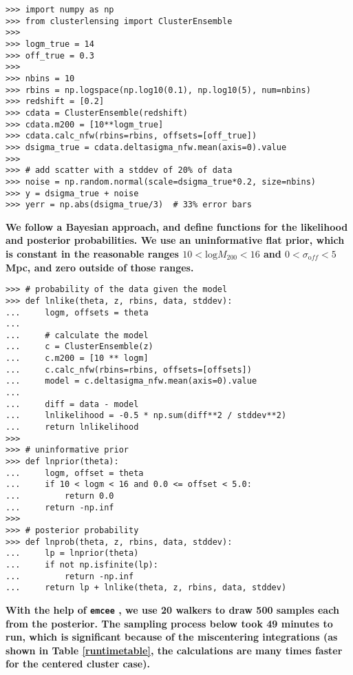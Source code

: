\documentclass[twocolumn]{aastex6}
\newcommand{\code}{\lstinline[style=codeintext]}
\begin{document}
\begin{verbatim}
>>> import numpy as np
>>> from clusterlensing import ClusterEnsemble
>>> 
>>> logm_true = 14
>>> off_true = 0.3
>>> 
>>> nbins = 10
>>> rbins = np.logspace(np.log10(0.1), np.log10(5), num=nbins)
>>> redshift = [0.2]
>>> cdata = ClusterEnsemble(redshift)
>>> cdata.m200 = [10**logm_true]
>>> cdata.calc_nfw(rbins=rbins, offsets=[off_true])
>>> dsigma_true = cdata.deltasigma_nfw.mean(axis=0).value
>>> 
>>> # add scatter with a stddev of 20% of data
>>> noise = np.random.normal(scale=dsigma_true*0.2, size=nbins)
>>> y = dsigma_true + noise
>>> yerr = np.abs(dsigma_true/3)  # 33% error bars
\end{verbatim}

{\bf We follow a Bayesian approach, and define functions for the likelihood and posterior probabilities. We use an uninformative flat prior, which is constant in the reasonable ranges $10 < \mathrm{log}M_{200} < 16$ and $0 < \sigma_{\mathrm off} < 5$ Mpc, and zero outside of those ranges.}

\begin{verbatim}
>>> # probability of the data given the model
>>> def lnlike(theta, z, rbins, data, stddev):
...     logm, offsets = theta
...     
...     # calculate the model
...     c = ClusterEnsemble(z)
...     c.m200 = [10 ** logm]
...     c.calc_nfw(rbins=rbins, offsets=[offsets])
...     model = c.deltasigma_nfw.mean(axis=0).value
...     
...     diff = data - model
...     lnlikelihood = -0.5 * np.sum(diff**2 / stddev**2)
...     return lnlikelihood
>>>
>>> # uninformative prior
>>> def lnprior(theta):
...     logm, offset = theta
...     if 10 < logm < 16 and 0.0 <= offset < 5.0:
...         return 0.0
...     return -np.inf
>>>
>>> # posterior probability
>>> def lnprob(theta, z, rbins, data, stddev):
...     lp = lnprior(theta)
...     if not np.isfinite(lp):
...         return -np.inf
...     return lp + lnlike(theta, z, rbins, data, stddev)
\end{verbatim}

{\bf With the help of \code{emcee} \citep{emcee}, we use 20 walkers to draw 500 samples each from the posterior. The sampling process below took 49 minutes to run, which is significant because of the miscentering integrations (as shown in Table \ref{runtimetable}, the calculations are many times faster for the centered cluster case).}
\end{document}
